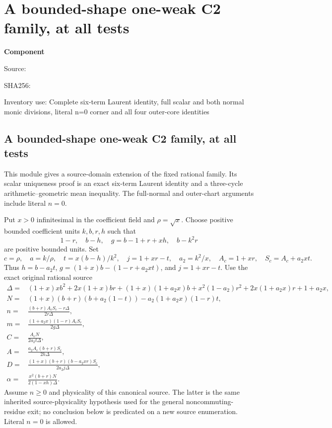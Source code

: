 \chapter{A bounded-shape one-weak C2 family, at all tests}
\label{component:pec59340d644f}
\noindent\textbf{Component }\par
{\small\noindent Source: \par}
{\small\noindent SHA256: \par}
{\small\noindent Inventory use: Complete six-term Laurent identity, full scalar and both normal monic divisions, literal n=0 corner and all four outer-core identities\par}
\medskip
\section{A bounded-shape one-weak C2 family, at all tests}
\label{pec59340d644f:sec:c2-general-single-angle}

This module gives a source-domain extension of the fixed rational
family.  Its scalar uniqueness proof is an exact six-term Laurent
identity and a three-cycle arithmetic--geometric mean inequality.
The full-normal and outer-chart arguments include literal $n=0$.

Put $x>0$ infinitesimal in the coefficient field and $\rho=\sqrt{x}$.
Choose positive bounded coefficient units $k,b,r,h$ such that
\[
 1-r,\quad b-h,\quad g=b-1+r+xh,\quad b-k^2r
\]
are positive bounded units.  Set
\[
 c=\rho,\quad a=k/\rho,\quad t=x(b-h)/k^2,
 \quad j=1+xr-t,\quad a_2=k^2/x,
 \quad A_c=1+xr,\quad S_c=A_c+a_2xt.
\]
Thus $h=b-a_2t$, $g=(1+x)b-(1-r+a_2xt)$, and $j=1+xr-t$.
Use the exact original rational source
\begin{align*}
 \Delta={}&(1+x)xb^2+2x(1+x)br+(1+x)(1+a_2x)b
       +x^2(1-a_2)r^2+2x(1+a_2x)r+1+a_2x,\\
 N={}&(1+x)(b+r)(b+a_2(1-t))-a_2(1+a_2x)(1-r)t,\\
 n={}&\frac{(b+r)A_cS_c-r\Delta}{2r\Delta},\\
 m={}&\frac{(1+a_2x)(1-r)A_cS_c}{2g\Delta},\\
 C={}&\frac{A_cN}{2a_2t\Delta},\\
 A={}&\frac{a_2A_c(b+r)S_c}{2h\Delta},\\
 D={}&\frac{(1+x)(b+r)(b-a_2xr)S_c}{2a_2j\Delta},\\
 \alpha={}&\frac{x^2(b+r)N}{2(1-xh)\Delta}.
\end{align*}
Assume $n\geq0$ and physicality of this canonical source.  The latter
is the same inherited source-physicality hypothesis used for the
general noncommuting-residue exit; no conclusion below is predicated
on a new source enumeration.  Literal $n=0$ is allowed.

